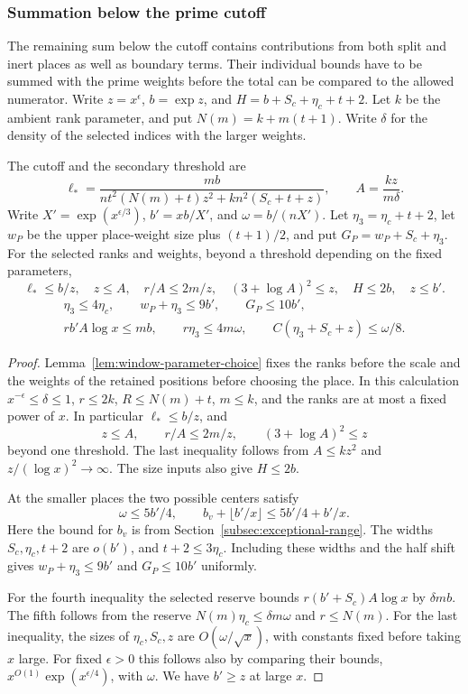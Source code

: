 \subsubsection*{Summation below the prime cutoff}
\label{subsec:prime-cost-sums}
\hypertarget{source-prime-cost-sums}{}

The remaining sum below the cutoff contains contributions from both split and inert places as well as boundary terms. Their individual bounds have to be summed with the prime weights before the total can be compared to the allowed numerator. Write \(z=x^\epsilon\), \(b=\exp z\), and
\(H=b+S_c+\eta_c+t+2\). Let \(k\) be the ambient rank parameter,
and put \(N(m)=k+m(t+1)\).
Write \(\delta\) for the density of the selected indices with the larger weights.
\begin{established}\label{hyp:small-prime-table-ranges}
The cutoff and the secondary threshold are
\[
 \ell_*=\frac{mb}{n t^2(N(m)+t)z^2+k n^2(S_c+t+z)},
 \qquad A=\frac{kz}{m\delta}.
\]
Write \(X'=\exp(x^{\epsilon/3})\), \(b'=xb/X'\), and
\(\omega=b/(nX')\). Let \(\eta_3=\eta_c+t+2\), let \(w_P\) be
the upper place-weight size plus \((t+1)/2\), and put
\(G_P=w_P+S_c+\eta_3\). For the selected ranks and weights, beyond a threshold depending on the fixed parameters,
\[
  \ell_*\le b/z,\quad z\le A,\quad r/A\le 2m/z,\quad(3+\log A)^2\le z,\quad H\le2b,\quad z\le b'.
\]
\[
 \begin{gathered}
 \eta_3\le4\eta_c,\qquad w_P+\eta_3\le9b',\qquad G_P\le10b',\\
 r b'A\log x\le mb,\qquad r\eta_3\le4m\omega,\qquad
 C(\eta_3+S_c+z)\le\omega/8 .
 \end{gathered}
\]
\end{established}
\begin{proof}
Lemma~\ref{lem:window-parameter-choice} fixes the ranks before the scale and the weights of the retained positions before choosing the place. In this
calculation \(x^{-\epsilon}\le\delta\le1\), \(r\le2k\),
\(R\le N(m)+t\), \(m\le k\), and the ranks are at most a fixed
power of \(x\). In particular \(\ell_*\le b/z\), and
\[
 z\le A,\qquad r/A\le 2m/z,\qquad
 (3+\log A)^2\le z
\]
beyond one threshold. The last inequality follows from
\(A\le k z^2\) and \(z/(\log x)^2\to\infty\).
The size inputs also give \(H\le2b\).

At the smaller places the two possible centers satisfy
\[
 \omega\le 5b'/4,\qquad b_v+\lfloor b'/x\rfloor\le5b'/4+b'/x .
\]
Here the bound for \(b_v\) is from Section~\ref{subsec:exceptional-range}. The widths \(S_c,\eta_c,t+2\) are \(o(b')\), and \(t+2\le3\eta_c\). Including these widths and the half shift gives \(w_P+\eta_3\le9b'\) and \(G_P\le10b'\) uniformly.

For the fourth inequality the selected reserve bounds
\(r(b'+S_c)A\log x\) by \(\delta mb\). The fifth follows from
the reserve \(N(m)\eta_c\le\delta m\omega\) and \(r\le N(m)\).
For the last inequality, the sizes of \(\eta_c,S_c,z\) are
\(O(\omega/\sqrt x)\), with constants fixed before taking \(x\)
large. For fixed \(\epsilon>0\) this follows also by comparing
their bounds, \(x^{O(1)}\exp(x^{\epsilon/4})\), with \(\omega\).
We have \(b'\ge z\) at large \(x\).
\end{proof}

